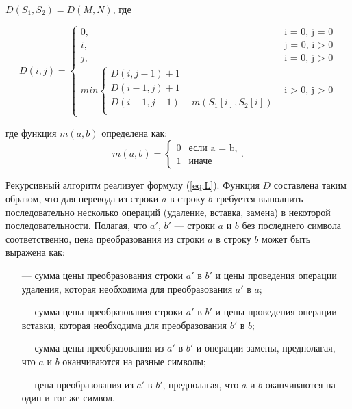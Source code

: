 \documentclass[a4paper,14pt, unknownkeysallowed]{extreport}
\begin{document}
$D(S_{1}, S_{2}) = D(M, N)$, где

\begin{equation}
	\label{eq:L}
	D(i, j) = \begin{cases}
	0, &\text{i = 0, j = 0}\\
	i, &\text{j = 0, i > 0}\\
	j, &\text{i = 0, j > 0}\\
	min \begin{cases}
		D(i, j - 1) + 1\\
		D(i - 1, j) + 1\\
		D(i - 1, j - 1) + m(S_{1}[i], S_{2}[i]) \\
	\end{cases}
	&\text{i > 0, j > 0}
	\end{cases}
\end{equation}

\vspace{5mm}

где функция $m(a, b)$ определена как:
\begin{equation}
\label{eq:m}
m(a, b) = \begin{cases}
0 &\text{если a = b,}\\
1 &\text{иначе}
\end{cases}.
\end{equation}


Рекурсивный алгоритм реализует формулу (\ref{eq:L}). Функция $D$ составлена таким образом, что для перевода из строки $a$ в строку $b$ требуется выполнить последовательно несколько операций (удаление, вставка, замена) в некоторой последовательности. Полагая, что $a'$, $b'$ — строки $a$ и $b$ без последнего символа соответственно, цена преобразования из строки $a$ в строку $b$ может быть выражена как:

\begin{itemize}
	\item[---] сумма цены преобразования строки $a'$ в $b'$ и цены проведения операции удаления, которая необходима для преобразования $a'$ в $a$;
	\item[---] сумма цены преобразования строки $a'$ в $b'$ и цены проведения операции вставки, которая необходима для преобразования $b'$ в $b$;
	\item[---] сумма цены преобразования из $a'$ в $b'$ и операции замены, предполагая, что $a$ и $b$ оканчиваются на разные символы;
	\item[---] цена преобразования из $a'$ в $b'$, предполагая, что $a$ и $b$ оканчиваются на один и тот же символ.
\end{itemize}
\end{document}
